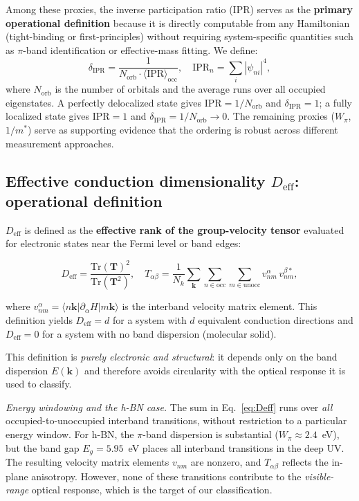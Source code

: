 \documentclass[twocolumn,showpacs,preprintnumbers,amsmath,amssymb,prb]{revtex4-2}
\begin{document}
Among these proxies, the inverse participation ratio (IPR) serves as
the \textbf{primary operational definition} because it is directly
computable from any Hamiltonian (tight-binding or first-principles)
without requiring system-specific quantities such as $\pi$-band
identification or effective-mass fitting. We define:
\begin{equation}
  \delta_\mathrm{IPR} = \frac{1}{N_\mathrm{orb} \cdot
    \langle \mathrm{IPR} \rangle_\mathrm{occ}},
  \quad
  \mathrm{IPR}_n = \sum_i |\psi_{ni}|^4,
  \label{eq:delta_IPR}
\end{equation}
where $N_\mathrm{orb}$ is the number of orbitals and the average runs
over all occupied eigenstates. A perfectly delocalized state gives
$\mathrm{IPR} = 1/N_\mathrm{orb}$ and $\delta_\mathrm{IPR} = 1$;
a fully localized state gives $\mathrm{IPR} = 1$ and
$\delta_\mathrm{IPR} = 1/N_\mathrm{orb} \to 0$.
The remaining proxies ($W_\pi$, $1/m^*$) serve as supporting evidence
that the ordering is robust across different measurement approaches.

\subsection{Effective conduction dimensionality $D_\mathrm{eff}$:
  operational definition}
\label{sec:Deff}

$D_\mathrm{eff}$ is defined as the \textbf{effective rank of the
group-velocity tensor} evaluated for electronic states near the Fermi
level or band edges:

\begin{equation}
  D_\mathrm{eff}
    = \frac{\mathrm{Tr}(\mathbf{T})^2}{\mathrm{Tr}(\mathbf{T}^2)},
  \quad
  T_{\alpha\beta}
    = \frac{1}{N_k} \sum_{\bm{k}} \sum_{n \in \mathrm{occ}} \sum_{m \in \mathrm{unocc}}
    v_{nm}^{\alpha}\, v_{nm}^{\beta *},
  \label{eq:Deff}
\end{equation}

\noindent where $v_{nm}^{\alpha} = \langle n\bm{k} | \partial_\alpha H | m\bm{k} \rangle$
is the interband velocity matrix element. This definition yields
$D_\mathrm{eff} = d$ for a system with $d$ equivalent conduction
directions and $D_\mathrm{eff} = 0$ for a system with no band
dispersion (molecular solid).

This definition is \emph{purely electronic and structural}: it depends
only on the band dispersion $E(\bm{k})$ and therefore avoids
circularity with the optical response it is used to classify.

\emph{Energy windowing and the h-BN case.}
The sum in Eq.~\ref{eq:Deff} runs over \emph{all} occupied-to-unoccupied
interband transitions, without restriction to a particular energy window.
For h-BN, the $\pi$-band dispersion is substantial ($W_\pi \approx
2.4$~eV), but the band gap $E_g = 5.95$~eV places all interband
transitions in the deep UV. The resulting velocity matrix elements
$v_{nm}$ are nonzero, and $T_{\alpha\beta}$ reflects the in-plane
anisotropy. However, none of these transitions contribute to the
\emph{visible-range} optical response, which is the target of our
classification.
\end{document}
